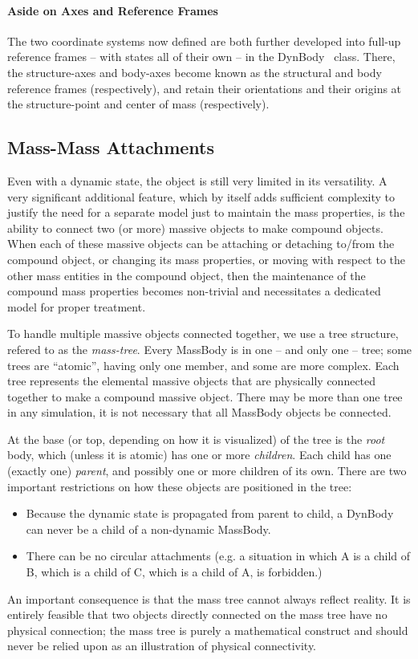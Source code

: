 \paragraph {Aside on Axes and Reference Frames}
The two coordinate systems now defined are both further developed into
full-up reference frames -- with states all of their own -- in the
DynBody~\cite{dynenv:DYNBODY} class.
There, the structure-axes and body-axes become known as the structural and
body reference frames (respectively), and retain their orientations and their
origins at the structure-point and center of mass (respectively).

\subsection{Mass-Mass Attachments}
Even with a dynamic state, the object is still very limited in its
versatility.
A very significant additional feature, which by itself adds sufficient
complexity to justify the need for a separate model just to maintain the mass
properties, is the ability to connect
two (or more) massive objects to make compound objects.  When each of these
massive objects can be attaching or detaching to/from the compound object, or
changing its mass properties, or
moving with respect to the other mass entities in the compound object, then
the
maintenance of the compound mass properties becomes non-trivial and
necessitates a dedicated model for proper treatment.

To handle multiple massive objects connected together, we use a tree
structure, refered to as the \textit{mass-tree}.
Every MassBody is in one -- and only one -- tree; some trees are ``atomic'',
having only one member,
and some are more complex.  Each tree represents the elemental massive objects
that are physically connected together to make a compound massive object.
There may be more than one tree in any simulation, it is not necessary that
all MassBody objects be connected.

At the base (or top, depending on how it is visualized) of the tree is the
\textit{root} body,
which (unless it is atomic) has one or more \textit{children}.  Each child has
one (exactly one) \textit{parent}, and possibly one or more children of its
own.  There are two important restrictions on how these objects are positioned
in the tree:
\begin{itemize}
 \item Because the dynamic state is propagated from parent to child, a DynBody
 can never be a child of a non-dynamic MassBody.
 \item There can be no circular attachments (e.g. a situation in which A is a
 child of B, which is a child of C, which is a child of A, is forbidden.)
\end{itemize}
An important consequence is that the mass tree cannot always
reflect reality.  It is entirely feasible that two objects directly connected
on the mass tree have no physical connection; the mass tree is purely a
mathematical construct and should never be relied upon as an illustration of
physical connectivity.

